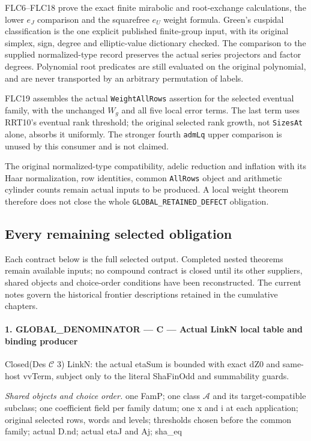 \documentclass[11pt,a4paper]{article}
\numberwithin{equation}{section}
\theoremstyle{remark}\newtheorem{remark}[theorem]{Remark}
\begin{document}
FLC6--FLC18 prove the exact finite mirabolic and root-exchange
calculations, the lower $e_J$ comparison and the squarefree $e_U$
weight formula. Green's cuspidal classification is the one explicit
published finite-group input, with its original simplex, sign, degree
and elliptic-value dictionary checked. The comparison to the supplied
normalized-type record preserves the actual series projectors and
factor degrees. Polynomial root predicates are still evaluated on
the original polynomial, and are never transported by an arbitrary
permutation of labels.

FLC19 assembles the actual \texttt{Weight\allowbreak All\allowbreak Rows} assertion for the
selected eventual family, with the unchanged $W_g$ and all five local
error terms. The last term uses RRT10's eventual rank threshold;
the original selected rank growth, not \texttt{Sizes\allowbreak At} alone,
absorbs it uniformly. The stronger fourth \texttt{adm\allowbreak Lq} upper
comparison is unused by this consumer and is not claimed.

The original normalized-type compatibility, adelic reduction and
inflation with its Haar normalization, row identities, common
\texttt{All\allowbreak Rows} object and arithmetic cylinder counts remain actual
inputs to be produced. A local weight theorem therefore does not close
the whole \texttt{GLOBAL\_\allowbreak RETAINED\_\allowbreak DEFECT} obligation.

\subsection{Every remaining selected obligation}

Each contract below is the full selected output. Completed nested
theorems remain available inputs; no compound contract is closed until
its other suppliers, shared objects and choice-order conditions have
been reconstructed. The current notes govern the historical frontier
descriptions retained in the cumulative chapters.
\paragraph{1. GLOBAL\_\allowbreak DENOMINATOR — C — Actual LinkN local table and binding producer}

Closed(Des $\mathcal C$ 3) LinkN: the actual etaSum is bounded with exact dZ0 and same-host vvTerm, subject only to the literal ShaFinOdd and summability guards.

\emph{Shared objects and choice order.} one FamP; one class $\mathcal A$ and its target-compatible subclass; one coefficient field per family datum; one x and i at each application; original selected rows, words and levels; thresholds chosen before the common family; actual D.nd; actual etaJ and Aj; sha\_\allowbreak eq
\end{document}
